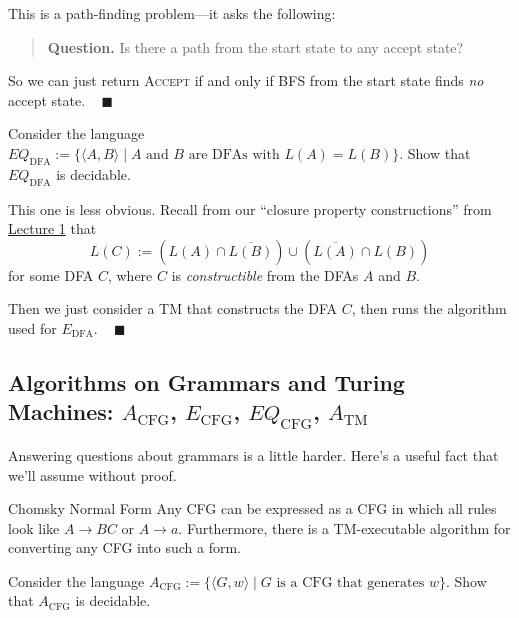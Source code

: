 \begin{solution}
    This is a path-finding problem---it asks the following:
    \begin{quote}
        \textbf{Question.}
        Is there a path from the start state to any accept state?
    \end{quote}
    So we can just return \textsc{Accept} if and only if
    BFS from the start state finds \emph{no} accept state. ~ $\blacksquare$
\end{solution}

\begin{problem}
    Consider the language $EQ_{\mathrm{DFA}} := \{
        \langle A, B \rangle \mid
        A \text{ and } B \text{ are DFAs with }
        L(A) = L(B)
    \}$.  Show that $EQ_{\mathrm{DFA}}$ is decidable.
\end{problem}

\begin{solution}
    This one is less obvious.
    Recall from our ``closure property constructions'' from
    \href{/18.404/lectures/1/#regular-operations-and-regular-expressions}{Lecture 1}
    that
    \[ L(C) := \left(
        L(A) \cap \overline{L(B)}
    \right) \cup \left(
        \overline{L(A)} \cap L(B)
    \right) \]
    for some DFA $C$,
    where $C$ is \emph{constructible} from the DFAs $A$ and $B$.

    Then we just consider a TM that constructs the DFA $C$,
    then runs the algorithm used for $E_{\mathrm{DFA}}$.
    ~ $\blacksquare$
\end{solution}

\subsection{Algorithms on Grammars and Turing Machines:
$A_{\mathrm{CFG}}$, $E_{\mathrm{CFG}}$,
$EQ_{\mathrm{CFG}}$, $A_{\mathrm{TM}}$}

Answering questions about grammars is a little harder.
Here's a useful fact that we'll assume without proof.

\begin{theorem}{Chomsky Normal Form}
    Any CFG can be expressed as a CFG
    in which all rules look like $A \rightarrow BC$ or $A \rightarrow a$.
    Furthermore, there is a TM-executable algorithm
    for converting any CFG into such a form.
\end{theorem}

\begin{problem}
    Consider the language
    $A_{\mathrm{CFG}} := \{\langle G, w \rangle \mid
    G \text{ is a CFG that generates } w\}$.
    Show that $A_{\mathrm{CFG}}$ is decidable.
\end{problem}


